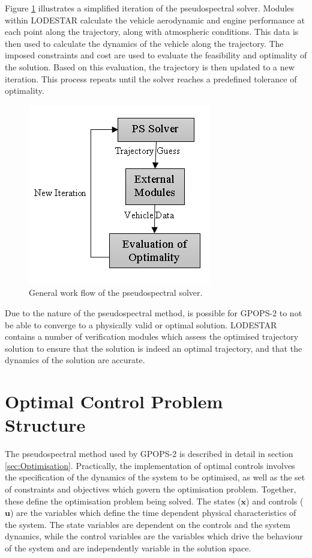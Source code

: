 Figure \ref{fig:FlowChartSmall} illustrates a simplified iteration of the pseudospectral solver.
Modules within LODESTAR calculate the vehicle aerodynamic and engine performance at each point along the trajectory, along with atmospheric conditions. This data is then used to calculate the dynamics of the vehicle along the trajectory. The imposed constraints and cost are used to evaluate the feasibility and optimality of the solution. Based on this evaluation, the trajectory is then updated to a new iteration. This process repeats until the solver reaches a predefined tolerance of optimality.
\begin{figure}[ht]
	\centering
	\includegraphics[width=0.5\linewidth]{figures/4_LODESTAR/FlowChartSmall}
	\caption{General work flow of the pseudospectral solver.}
	\label{fig:FlowChartSmall}
\end{figure}
Due to the nature of the pseudospectral method, is possible for GPOPS-2 to not be able to converge to a physically valid or optimal solution. 
LODESTAR contains a number of verification modules which assess the optimised trajectory solution to ensure that the solution is indeed an optimal trajectory, and that the dynamics of the solution are accurate. 


\section{Optimal Control Problem Structure}

The pseudospectral method used by GPOPS-2 is described in detail in section \ref{sec:Optimisation}. Practically, the implementation of optimal controls involves the specification of the dynamics of the system to be optimised, as well as the set of constraints and objectives which govern the optimisation problem. 
 Together, these define the optimisation problem being solved. The states ($\mathbf{x}$) and controls ($\mathbf{u}$) are the variables which define the time dependent physical characteristics of the system. The state variables are dependent on the controls and the system dynamics, while the control variables are the variables which drive the behaviour of the system and are independently variable in the solution space.  



